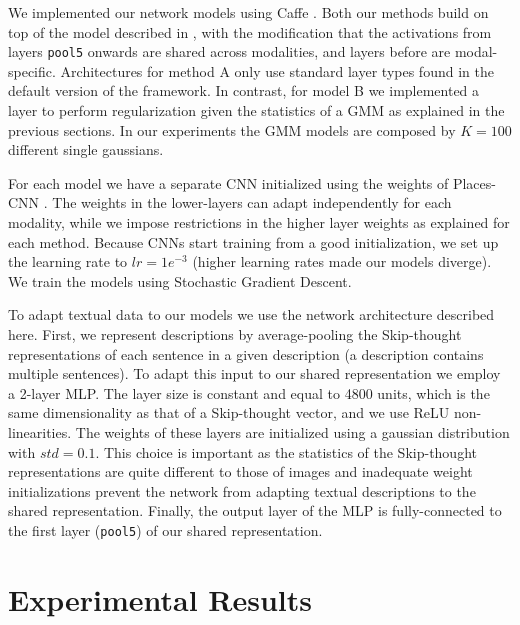 \documentclass[10pt,journal,compsoc]{IEEEtran}
\begin{document}
    We implemented our network models using Caffe \cite{jia2014caffe}. Both  our  methods  build  on  top  of  the  model  described in \cite{krizhevsky2012imagenet}, with the modification that the activations from layers \texttt{pool5} onwards are shared across modalities, and layers before are modal-specific. Architectures for method A only use standard layer types found in the default version of the framework. In contrast, for model B we implemented a layer to perform regularization given the statistics of a GMM as explained in the previous sections. In our experiments the GMM models are composed by $K = 100$ different single gaussians. 
    
    For each model we have a separate CNN initialized using the weights of Places-CNN \cite{zhou2014learning}. The weights in the lower-layers can adapt independently for each modality, while we impose restrictions in the higher layer weights as explained for each method. Because CNNs start training from a good initialization, we set up the learning rate to $lr = 1e^{-3}$ (higher learning rates made our models diverge). We train the models using Stochastic Gradient Descent.
    
    To adapt textual data to our models we use the network architecture described here. First, we represent descriptions by average-pooling the Skip-thought \cite{kiros2015skip} representations of each sentence in a given description (a description contains multiple sentences). To adapt this input to our shared representation we employ a 2-layer MLP. The layer size is constant and equal to 4800 units, which is the same dimensionality as that of a Skip-thought vector, and we use ReLU non-linearities. The weights of these layers are initialized using a gaussian distribution with $std = 0.1$. This choice is important as the statistics of the Skip-thought representations are quite different to those of images and inadequate weight initializations prevent the network from adapting textual descriptions to the shared representation. Finally, the output layer of the MLP is fully-connected to the first layer (\texttt{pool5}) of our shared representation.


\section{Experimental Results}

	
\end{document}
